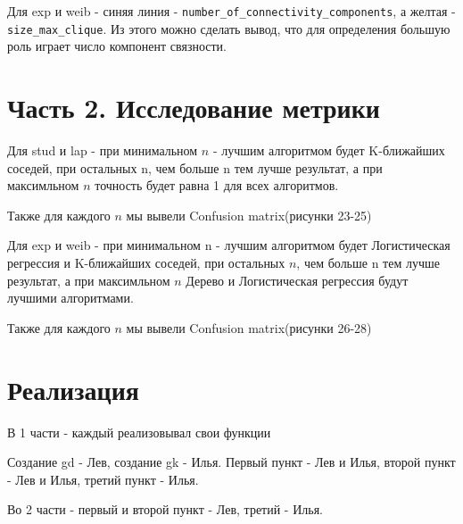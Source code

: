 \documentclass{HSEtitle}
\begin{document}
Для exp и weib - синяя линия - \texttt{number\_of\_connectivity\_components}, а желтая  - \texttt{size\_max\_clique}. Из этого можно сделать вывод, что для определения большую роль играет число компонент связности.

\section{Часть 2. Исследование метрики}

Для stud и lap - при минимальном $n$ - лучшим алгоритмом будет K-ближайших соседей, при остальных n, чем больше n тем лучше результат, а при максимльном $n$ точность будет равна 1 для всех алгоритмов.

Также для каждого $n$ мы вывели Confusion matrix(рисунки 23-25)

Для exp и weib - при минимальном n - лучшим алгоритмом будет Логистическая регрессия и K-ближайших соседей, при остальных $n$, чем больше n тем лучше результат, а при максимльном $n$ Дерево и Логистическая регрессия будут лучшими алгоритмами.

Также для каждого $n$ мы вывели Confusion matrix(рисунки 26-28)

\section{Реализация}

В 1 части - каждый реализовывал свои функции

Создание gd - Лев, создание gk - Илья. Первый пункт - Лев и Илья, второй пункт - Лев и Илья, третий пункт - Илья.

Во 2 части - первый и второй пункт - Лев, третий - Илья.
\end{document}

